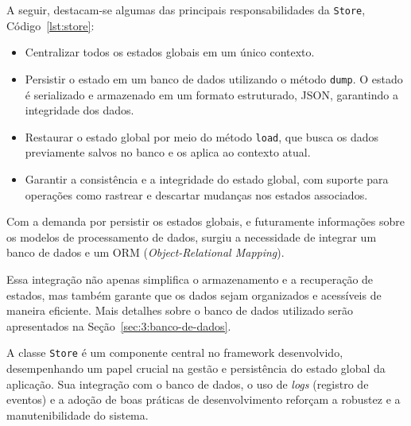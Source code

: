 \hfill \break

A seguir, destacam-se algumas das principais responsabilidades da \texttt{Store}, Código~\ref{lst:store}:

\begin{itemize}
    \item Centralizar todos os estados globais em um único contexto.
    \item Persistir o estado em um banco de dados utilizando o método \texttt{dump}. O estado é serializado e armazenado em um formato estruturado, JSON, garantindo a integridade dos dados.
    \item Restaurar o estado global por meio do método \texttt{load}, que busca os dados previamente salvos no banco e os aplica ao contexto atual.
    \item Garantir a consistência e a integridade do estado global, com suporte para operações como rastrear e descartar mudanças nos estados associados.
\end{itemize}

Com a demanda por persistir os estados globais, e futuramente informações sobre os modelos de processamento de dados, surgiu a necessidade de integrar um banco de dados e um ORM (\textit{Object-Relational Mapping}). 

Essa integração não apenas simplifica o armazenamento e a recuperação de estados, mas também garante que os dados sejam organizados e acessíveis de maneira eficiente. Mais detalhes sobre o banco de dados utilizado serão apresentados na Seção~\ref{sec:3:banco-de-dados}.

A classe \texttt{Store} é um componente central no framework desenvolvido, desempenhando um papel crucial na gestão e persistência do estado global da aplicação. Sua integração com o banco de dados, o uso de \textit{logs} (registro de eventos) e a adoção de boas práticas de desenvolvimento reforçam a robustez e a manutenibilidade do sistema.